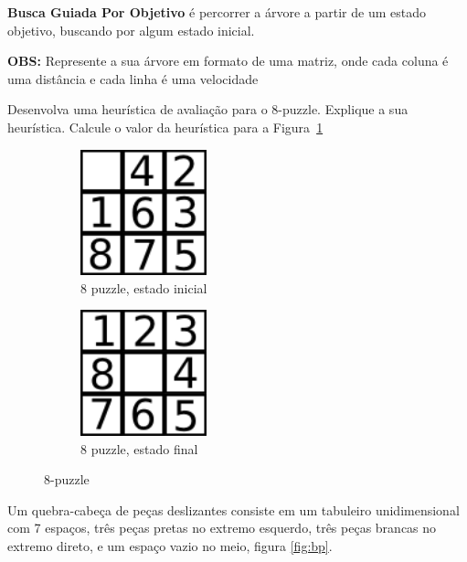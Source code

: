 \documentclass[12pt]{exam}
\begin{document}
\begin{questions}
\textbf{Busca Guiada Por Objetivo} é percorrer a árvore a partir de um estado objetivo, buscando por algum estado inicial.

\textbf{OBS:} Represente a sua árvore em formato de uma matriz, onde cada coluna é uma distância e cada linha é uma velocidade

\break






\question Desenvolva uma heurística de avaliação para o 8-puzzle.
Explique a sua heurística. 
Calcule o valor da heurística para a Figura~\ref{fig:8p01}\\


\begin{figure}
  \centering
  \begin{subfigure}[b]{0.48\textwidth}
  	\center
    \includegraphics[width=0.40\textwidth]{8p01}
    \caption{8 puzzle, estado inicial}
    \label{fig:8p01}
  \end{subfigure}
  \begin{subfigure}[b]{0.48\textwidth}
  	\center
    \includegraphics[width=0.40\textwidth]{8pfinal}
    \caption{8 puzzle, estado final}
    \label{fig:8pfinal}
  \end{subfigure}
  \caption{8-puzzle}\label{fig:8p}
\end{figure}






\question Um quebra-cabeça de peças deslizantes consiste em um tabuleiro unidimensional com 7 espaços, três peças pretas no extremo esquerdo, três peças brancas no extremo direto, e um espaço vazio no meio, figura \ref{fig:bp}.


\end{questions}
\end{document}
